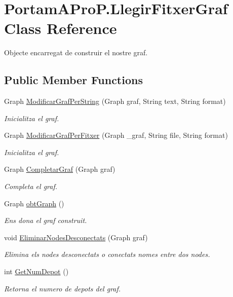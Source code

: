 \hypertarget{class_portam_a_pro_p_1_1_llegir_fitxer_graf}{}\section{Portam\+A\+Pro\+P.\+Llegir\+Fitxer\+Graf Class Reference}
\label{class_portam_a_pro_p_1_1_llegir_fitxer_graf}


Objecte encarregat de construir el nostre graf.  


\subsection*{Public Member Functions}
\begin{DoxyCompactItemize}
\item 
Graph \hyperlink{class_portam_a_pro_p_1_1_llegir_fitxer_graf_a2c388c5057711db37543f939204134f2}{Modificar\+Graf\+Per\+String} (Graph graf, String text, String format)
\begin{DoxyCompactList}\small\item\em Inicialitza el graf. \end{DoxyCompactList}\item 
Graph \hyperlink{class_portam_a_pro_p_1_1_llegir_fitxer_graf_afdbe4a4f48460910592efa5589776d62}{Modificar\+Graf\+Per\+Fitxer} (Graph \+\_\+graf, String file, String format)
\begin{DoxyCompactList}\small\item\em Inicialitza el graf. \end{DoxyCompactList}\item 
Graph \hyperlink{class_portam_a_pro_p_1_1_llegir_fitxer_graf_a584bea22b69e7dde9159c7aac0a11de1}{Completar\+Graf} (Graph graf)
\begin{DoxyCompactList}\small\item\em Completa el graf. \end{DoxyCompactList}\item 
Graph \hyperlink{class_portam_a_pro_p_1_1_llegir_fitxer_graf_a9d28fa913057ede0ea78757f490e5a7d}{obt\+Graph} ()
\begin{DoxyCompactList}\small\item\em Ens dona el graf construit. \end{DoxyCompactList}\item 
void \hyperlink{class_portam_a_pro_p_1_1_llegir_fitxer_graf_ad2bb4a17c5af9b5c6294f6ea1a17f63d}{Eliminar\+Nodes\+Desconectats} (Graph graf)
\begin{DoxyCompactList}\small\item\em Elimina els nodes desconectats o conectats nomes entre dos nodes. \end{DoxyCompactList}\item 
int \hyperlink{class_portam_a_pro_p_1_1_llegir_fitxer_graf_a45dd3b57e65010e9e6eaf940d7695527}{Get\+Num\+Depot} ()
\begin{DoxyCompactList}\small\item\em Retorna el numero de depots del graf. \end{DoxyCompactList}\end{DoxyCompactItemize}


